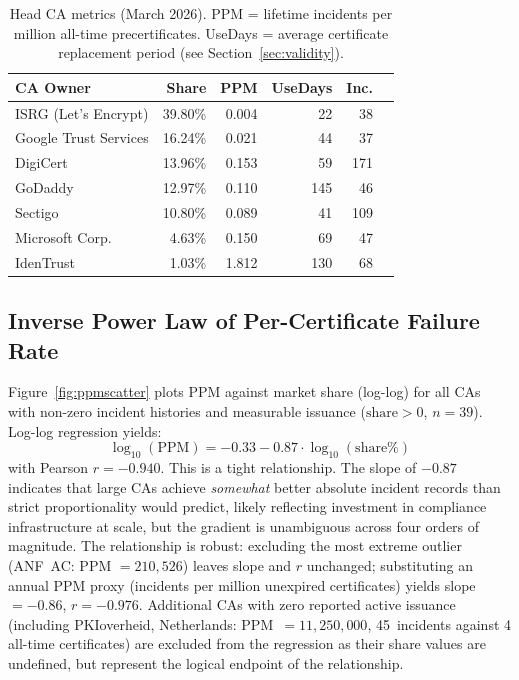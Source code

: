 \documentclass[10pt,twocolumn,letterpaper]{article}
\begin{document}
\begin{table}[t]
\centering
\footnotesize
\setlength{\tabcolsep}{3pt}
\caption{Head CA metrics (March 2026). PPM = lifetime incidents per million
all-time precertificates. UseDays = average certificate replacement period
(see Section~\ref{sec:validity}).}
\label{tab:head}
\begin{tabularx}{\columnwidth}{@{}lrrrrr@{}}
\toprule
CA Owner & Share & PPM & UseDays & Inc. \\
\midrule
ISRG (Let's Encrypt) & 39.80\% & 0.004 & 22 & 38 \\
Google Trust Services  & 16.24\% & 0.021 & 44 & 37 \\
DigiCert               & 13.96\% & 0.153 & 59 & 171 \\
GoDaddy                & 12.97\% & 0.110 & 145 & 46 \\
Sectigo                & 10.80\% & 0.089 & 41 & 109 \\
Microsoft Corp.        &  4.63\% & 0.150 & 69 & 47 \\
IdenTrust              &  1.03\% & 1.812 & 130 & 68 \\
\bottomrule
\end{tabularx}
\end{table}

\subsection{Inverse Power Law of Per-Certificate Failure Rate}
\label{sec:powerlaw}

Figure~\ref{fig:ppmscatter} plots PPM against market share (log-log) for
all CAs with non-zero incident histories and measurable issuance
($\text{share} > 0$, $n = 39$). Log-log regression yields:
\[
\log_{10}(\text{PPM}) = -0.33 - 0.87 \cdot \log_{10}(\text{share\%})
\]
with Pearson $r = -0.940$. This is a tight relationship. The slope of $-0.87$
indicates that large CAs achieve \textit{somewhat} better absolute incident
records than strict proportionality would predict, likely reflecting
investment in compliance infrastructure at scale, but the gradient is
unambiguous across four orders of magnitude. The relationship is robust:
excluding the most extreme outlier (ANF~AC: PPM $= 210{,}526$) leaves
slope and $r$ unchanged; substituting an annual PPM proxy (incidents per
million unexpired certificates) yields slope~$= -0.86$, $r = -0.976$.
Additional CAs with zero reported active issuance (including
PKIoverheid, Netherlands: PPM~$= 11{,}250{,}000$, 45~incidents against
4 all-time certificates) are excluded from the regression as their share
values are undefined, but represent the logical endpoint of the relationship.
\end{document}
